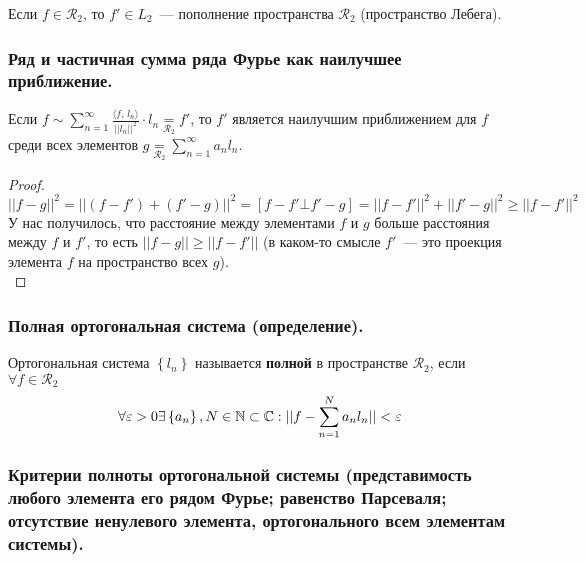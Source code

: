 Если $f \in \mathcal{R}_2$, то $f' \in L_2$~--- пополнение пространства $\mathcal{R}_2$ (пространство Лебега).

\subsubsection{Ряд и частичная сумма ряда Фурье как наилучшее приближение. \label{subsubsec:label3}}
\begin{theorem*}
    Если $f \sim \sum_{n=1}^\infty \frac{\langle f,\, l_n \rangle}{\lvert \lvert l_n \rvert \rvert^2} \cdot l_n \underset{\mathcal{R}_2}{=}f'$, то $f'$ является наилучшим приближением для $f$ среди всех элементов $g \underset{\mathcal{R}_2}{=} \sum_{n=1}^\infty a_n l_n$.    
\end{theorem*}
\begin{proof}
    \[\lvert \lvert f - g \rvert \rvert^2 = \lvert \lvert (f - f') + (f' - g) \rvert \rvert^2 = [f - f' \bot f' - g] = \lvert \lvert f - f' \rvert \rvert^2 + \lvert \lvert f' - g \rvert \rvert^2 \geq \lvert \lvert f - f' \rvert \rvert^2 \]
    У нас получилось, что расстояние между элементами $f$ и $g$ больше расстояния между $f$ и $f'$, то есть $\lvert \lvert f - g \rvert \rvert \geq \lvert \lvert f - f' \rvert \rvert$ (в каком-то смысле $f'$~--- это проекция элемента $f$ на пространство всех $g$).\\
\end{proof}

\subsubsection{Полная ортогональная система (определение).}
\begin{definition*}
    Ортогональная система $\left\{ l_n \right\}$ называется \textbf{полной} в пространстве $\mathcal{R}_2$, если $\forall f \in \mathcal{R}_2$
    \[\forall \varepsilon > 0 \exists \left\{ a_n \right\}, N \in \mathbb{N} \subset \mathbb{C}: \lvert \lvert f - \sum_{n=1}^N a_n l_n \rvert \rvert < \varepsilon\]        
\end{definition*}

\subsubsection{Критерии полноты ортогональной системы (представимость любого элемента его рядом Фурье; равенство Парсеваля; отсутствие ненулевого элемента, ортогонального всем элементам системы).}

